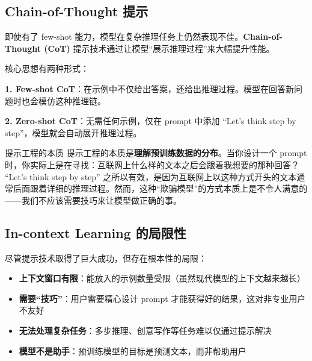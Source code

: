 \documentclass[a4paper]{article}
\begin{document}
\subsection{Chain-of-Thought 提示}

即使有了 few-shot 能力，模型在复杂推理任务上仍然表现不佳。\textbf{Chain-of-Thought (CoT)} 提示技术通过让模型``展示推理过程''来大幅提升性能。





核心思想有两种形式：

\textbf{1. Few-shot CoT}：在示例中不仅给出答案，还给出推理过程。模型在回答新问题时也会模仿这种推理链。

\textbf{2. Zero-shot CoT}：无需任何示例，仅在 prompt 中添加 ``Let's think step by step''，模型就会自动展开推理过程。









\begin{warningbox}{提示工程的本质}
提示工程的本质是\textbf{理解预训练数据的分布}。当你设计一个 prompt 时，你实际上是在寻找：互联网上什么样的文本之后会跟着我想要的那种回答？ ``Let's think step by step'' 之所以有效，是因为互联网上以这种方式开头的文本通常后面跟着详细的推理过程。然而，这种``欺骗模型''的方式本质上是不令人满意的——我们不应该需要技巧来让模型做正确的事。
\end{warningbox}

\subsection{In-context Learning 的局限性}

尽管提示技术取得了巨大成功，但存在根本性的局限：

\begin{itemize}
    \item \textbf{上下文窗口有限}：能放入的示例数量受限（虽然现代模型的上下文越来越长）
    \item \textbf{需要``技巧''}：用户需要精心设计 prompt 才能获得好的结果，这对非专业用户不友好
    \item \textbf{无法处理复杂任务}：多步推理、创意写作等任务难以仅通过提示解决
    \item \textbf{模型不是助手}：预训练模型的目标是预测文本，而非帮助用户
\end{itemize}
\end{document}
